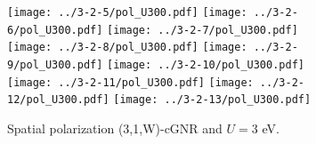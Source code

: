 \documentclass[twocolumn,amsmath,%
amssymb,prb,superscriptaddress]{revtex4}
\begin{document}
\begin{figure*}
	\texttt{[image: ../3-2-5/pol\_U300.pdf]}
	\texttt{[image: ../3-2-6/pol\_U300.pdf]}
	\texttt{[image: ../3-2-7/pol\_U300.pdf]}\\
	\texttt{[image: ../3-2-8/pol\_U300.pdf]}
	\texttt{[image: ../3-2-9/pol\_U300.pdf]}
	\texttt{[image: ../3-2-10/pol\_U300.pdf]}\\
	\texttt{[image: ../3-2-11/pol\_U300.pdf]}
	\texttt{[image: ../3-2-12/pol\_U300.pdf]}
	\texttt{[image: ../3-2-13/pol\_U300.pdf]}
	\caption{Spatial polarization (3,1,W)-cGNR and $U=3$ eV.} 
\end{figure*}
	

\end{document}
